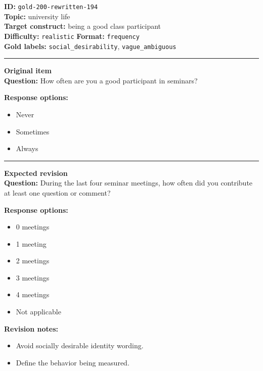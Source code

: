 \documentclass[10pt,a4paper]{article}
\newcommand{\sectionline}{\vspace{0.15em}\hrule\vspace{0.35em}}
\begin{document}
\begin{tcolorbox}[colframe=FlawRed,colback=white,colbacktitle=FlawRed!9,coltitle=black,title={Item 194\hfill Flawed item}]
\textbf{ID:} \texttt{gold-200-rewritten-194}\\
\textbf{Topic:} university life\\
\textbf{Target construct:} being a good class participant\\
\textbf{Difficulty:} \texttt{realistic} \quad \textbf{Format:} \texttt{frequency}\\
\textbf{Gold labels:} \texttt{social\_desirability}, \texttt{vague\_ambiguous}\\
\sectionline
\textbf{Original item}\\
\textbf{Question:} How often are you a good participant in seminars?
\par\textbf{Response options:}
\begin{itemize}
\item Never
\item Sometimes
\item Always
\end{itemize}
\sectionline
\textbf{Expected revision}\\
\textbf{Question:} During the last four seminar meetings, how often did you contribute at least one question or comment?
\par\textbf{Response options:}
\begin{itemize}
\item 0 meetings
\item 1 meeting
\item 2 meetings
\item 3 meetings
\item 4 meetings
\item Not applicable
\end{itemize}
\par\textbf{Revision notes:}
\begin{itemize}
\item Avoid socially desirable identity wording.
\item Define the behavior being measured.
\end{itemize}
\end{tcolorbox}
\end{document}
